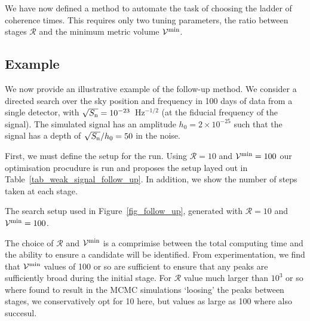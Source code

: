\documentclass[aps, prd, twocolumn, superscriptaddress, floatfix, showpacs, nofootinbib, longbibliography]{revtex4-1}
\begin{document}
We have now defined a method to automate the task of choosing the ladder of
coherence times. This requires only two tuning parameters, the ratio between
stages $\mathcal{R}$ and the minimum metric volume $\mathcal{V}^{\min}$.

\subsection{Example}

We now provide an illustrative example of the follow-up method. We consider a
directed search over the sky position and frequency in 100 days of data from a
single detector, with $\sqrt{S_{\rm n}}=10^{-23}$~Hz$^{-1/2}$ (at the fiducial
frequency of the signal). The simulated signal has an amplitude
$h_0=2\times10^{-25}$ such that the signal has a depth of $\sqrt{S_{\rm n}}/h_0=50$
in the noise.

First, we must define the setup for the run. Using $\mathcal{R}=10$ and
$\mathcal{V}^{\rm min}=100$ our optimisation procudure is run and proposes the setup
layed out in Table~\ref{tab_weak_signal_follow_up}. In addition, we show the
number of steps taken at each stage.
\begin{table}[htb]
\caption{The search setup used in Figure~\ref{fig_follow_up}, generated with
$\mathcal{R}=10$ and $\mathcal{V}^{\rm min}=100$.}
\label{tab_weak_signal_follow_up}

\end{table}

The choice of $\mathcal{R}$ and $\mathcal{V}^{\rm min}$ is a comprimise between the
total computing time and the ability to ensure a candidate will be identified.
From experimentation, we find that $\mathcal{V}^{\rm min}$ values of 100 or so are
sufficient to ensure that any peaks are sufficiently broad during the
initial stage. For $\mathcal{R}$ value much larger than $10^{3}$ or so where
found to result in the MCMC simulations `loosing' the peaks between stages, we
conservatively opt for 10 here, but values as large as 100 where also succesul.
\end{document}
